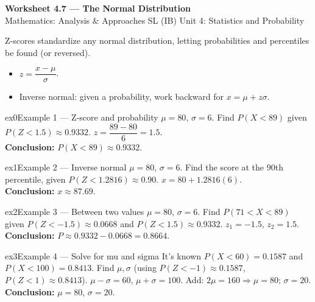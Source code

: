 \documentclass[11pt]{article}
\begin{document}
\begin{center}
{\LARGE\bfseries\color{titleblue}Worksheet 4.7 --- The Normal Distribution}\\[2pt]
{\small Mathematics: Analysis \& Approaches SL (IB) \textperiodcentered{} Unit 4: Statistics and Probability}
\end{center}

\begin{ideabox}
Z-scores standardize any normal distribution, letting probabilities and percentiles be found (or reversed).
\begin{itemize}[leftmargin=*,itemsep=2pt]
  \item $z=\dfrac{x-\mu}{\sigma}$.
  \item Inverse normal: given a probability, work backward for $x=\mu+z\sigma$.
\end{itemize}
\end{ideabox}


\begin{example}{ex0}{Example 1 --- Z-score and probability}
$\mu=80$, $\sigma=6$. Find $P(X<89)$ given $P(Z<1.5)\approx0.9332$.\soln
$z=\dfrac{89-80}{6}=1.5$.\\[3pt]\textbf{Conclusion:} $P(X<89)\approx0.9332$.
\end{example}

\begin{example}{ex1}{Example 2 --- Inverse normal}
$\mu=80$, $\sigma=6$. Find the score at the 90th percentile, given $P(Z<1.2816)\approx0.90$.\soln
$x=80+1.2816(6)$.\\[3pt]\textbf{Conclusion:} $x\approx87.69$.
\end{example}

\begin{example}{ex2}{Example 3 --- Between two values}
$\mu=80$, $\sigma=6$. Find $P(71<X<89)$ given $P(Z<-1.5)\approx0.0668$ and $P(Z<1.5)\approx0.9332$.\soln
$z_1=-1.5$, $z_2=1.5$.\\[3pt]\textbf{Conclusion:} $P\approx0.9332-0.0668=0.8664$.
\end{example}

\begin{example}{ex3}{Example 4 --- Solve for mu and sigma}
It's known $P(X<60)=0.1587$ and $P(X<100)=0.8413$. Find $\mu,\sigma$ (using $P(Z<-1)\approx0.1587$, $P(Z<1)\approx0.8413$).\soln
$\mu-\sigma=60$, $\mu+\sigma=100$. Add: $2\mu=160\Rightarrow\mu=80$; $\sigma=20$.\\[3pt]\textbf{Conclusion:} $\mu=80$, $\sigma=20$.
\end{example}
\end{document}
